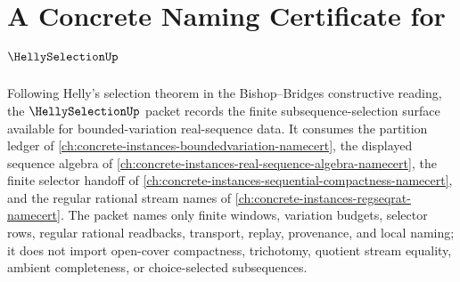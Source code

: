 \chapter{A Concrete Naming Certificate for $\HellySelectionUp$}
\label{ch:concrete-instances-helly-selection-namecert}

Following Helly's selection theorem in the Bishop--Bridges constructive reading, the $\HellySelectionUp$ packet records the finite subsequence-selection surface available for bounded-variation real-sequence data. It consumes the partition ledger of \autoref{ch:concrete-instances-boundedvariation-namecert}, the displayed sequence algebra of \autoref{ch:concrete-instances-real-sequence-algebra-namecert}, the finite selector handoff of \autoref{ch:concrete-instances-sequential-compactness-namecert}, and the regular rational stream names of \autoref{ch:concrete-instances-regseqrat-namecert}. The packet names only finite windows, variation budgets, selector rows, regular rational readbacks, transport, replay, provenance, and local naming; it does not import open-cover compactness, trichotomy, quotient stream equality, ambient completeness, or choice-selected subsequences.

